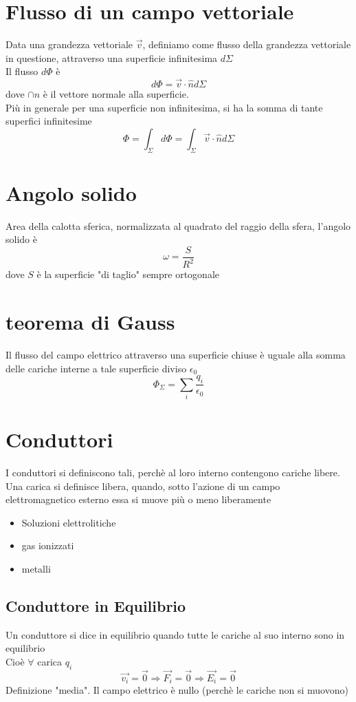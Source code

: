 \documentclass[a4paper]{report}
\begin{document}
  \section{Flusso di un campo vettoriale}
  Data una grandezza vettoriale $\vec{v}$,  definiamo come flusso della grandezza vettoriale in questione, attraverso una superficie infinitesima $d \Sigma$\\
  Il flusso $d \Phi$ è
  \[ d \Phi = \vec{v}\cdot \hat{n} d \Sigma \]
  dove $\cap{n}$ è il vettore normale alla superficie.\\
  Più in generale per una superficie non infinitesima, si ha la somma di tante superfici infinitesime
  \[ \Phi = \int_\Sigma d\Phi = \int_\Sigma \vec{v} \cdot \hat{n} d\Sigma \]

  \section{Angolo solido}
  Area della calotta sferica, normalizzata al quadrato del raggio della sfera, l'angolo solido è
  \[ \omega = \frac{S}{R^2} \]
  dove $S$ è la superficie "di taglio" sempre ortogonale

  \section{teorema di Gauss}
  Il flusso del campo elettrico attraverso una superficie chiuse è uguale alla somma delle cariche interne a tale superficie diviso $\epsilon_0$
  \[ \Phi_{\Sigma} = \sum_i \frac{q_i}{\epsilon_0} \]

  \section{Conduttori}
  I conduttori si definiscono tali, perchè al loro interno contengono cariche libere. Una carica si definisce libera, quando, sotto l'azione di un campo elettromagnetico esterno essa si muove più o meno liberamente
  \begin{itemize}
    \item Soluzioni elettrolitiche
      \item gas ionizzati
    \item metalli
  \end{itemize}

  \subsection{Conduttore in Equilibrio}
  Un conduttore si dice in equilibrio quando tutte le cariche al suo interno sono in equilibrio\\
  Cioè $\forall$ carica $q_i$
  \[\vec{v_i} = \vec{0} \Rightarrow \vec{F_i} = \vec{0} \Rightarrow \vec{E_i} = \vec{0}\]
  Definizione "media". Il campo elettrico è nullo (perchè le cariche non si muovono)
\end{document}
